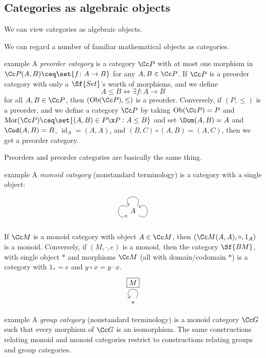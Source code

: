 \documentclass[class=article, crop=false]{standalone}
\begin{document}
\subsection*{Categories as algebraic objects}

We can view categories as algebraic objects.

We can regard a number of familiar mathematical objects as categories.
\begin{understandingcheck}{example}
  A \emph{preorder category} is a category $\Cc P$ with at most one morphism in $\Cc P(A,B) \ceq \set{f\colon A \to B}$ for any $A,B \in \Cc P$. If $\Cc P$ is a preorder category with only a $\Sf{Set}$'s worth of morphisms, and we define
    \[
      A \leq B \iff \exists f\colon A \to B
    \]
  for all $A,B \in \Cc P$, then $(\operatorname{Ob}(\Cc P), \leq)$ is a preorder. Conversely, if $(P, \leq)$ is a preorder, and we define a category $\Cc P$ by taking  $\operatorname{Ob}(\Cc P) = P$ and $\operatorname{Mor}(\Cc P) \ceq \set{(A,B) \in P \x P : A \leq B}$ and set $\Dom(A,B) = A$ and $\Cod(A,B) = B$, $\operatorname{id}_A = (A,A)$, and $(B,C) \circ (A,B) = (A,C)$, then we get a preorder category.

  Preorders and preorder categories are basically the same thing.
\end{understandingcheck}

\begin{understandingcheck}{example}
  A \emph{monoid category} (nonstandard terminology) is a category with a single object:
    \[
      \begin{tikzcd}
        A \arrow[loop, distance=2em, in=125, out=55] \arrow[loop, distance=2em, in=35, out=325] \arrow[loop, distance=2em, in=215, out=145]
      \end{tikzcd}
    \]

  If $\Cc M$ is a monoid category with object $A \in \Cc M$, then $(\Cc M(A,A), \circ, 1_A)$ is a monoid. Conversely, if $(M, \cdot, e)$ is a monoid, then the category $\Sf{BM}$, with single object $*$ and morphisms $\Cc M$ (all with domain/codomain $*$) is a category with $1_* = e$ and $y\circ x = y \cdot x$.
    \[
      \begin{tikzcd}
        * \arrow["\boxed M"', loop, distance=2em, in=125, out=55]
      \end{tikzcd}
    \]

\end{understandingcheck}

\begin{understandingcheck}{example}
  A \emph{group category} (nonstandard terminology) is a monoid category $\Cc G$ such that every morphism of $\Cc G$ is an isomorphism. The same constructions relating monoid and monoid categories restrict to constructions relating groups and group categories.
\end{understandingcheck}
\end{document}
